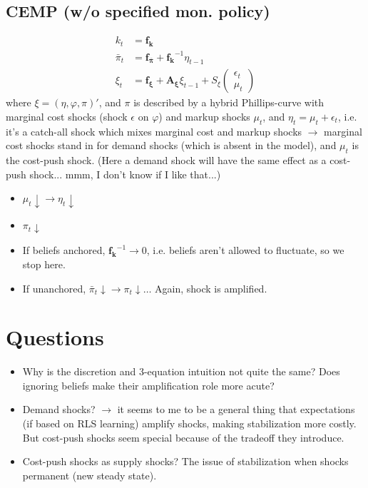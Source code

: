 \documentclass[11pt]{article}
\renewcommand{\[}{\begin{equation}}
\renewcommand{\]}{\end{equation}}
\begin{document}
	
\subsection{CEMP (w/o specified mon. policy)}
\begin{align}
k_t & = \mathbf{f_k} \\
\bar{\pi}_t &=\mathbf{f_{\bar{\pi}}} + \mathbf{f_k}^{-1}\eta_{t-1}\\
\xi_t & = \mathbf{f_{\xi}} + \mathbf{A_{\xi}} \xi_{t-1} + S_{\xi} \begin{pmatrix} \epsilon_t \\ \mu_t \end{pmatrix} 
\end{align}
where $\xi = (\eta, \varphi, \pi)'$, and $\pi$ is described by a hybrid Phillips-curve with marginal cost shocks (shock $\epsilon$ on $\varphi$) and markup shocks $\mu_t$, and $\eta_t = \mu_t + \epsilon_t$, i.e. it's a catch-all shock which mixes marginal cost and markup shocks $\rightarrow$ marginal cost shocks stand in for demand shocks (which is absent in the model), and $\mu_t$ is the cost-push shock. (Here a demand shock will have the same effect as a cost-push shock... mmm, I don't know if I like that...)
\begin{itemize}
\item $\mu_t \downarrow \rightarrow \eta_t \downarrow$
\item $\pi_t \downarrow$
\item If beliefs anchored, $\mathbf{f_k}^{-1} \rightarrow 0$, i.e. beliefs aren't allowed to fluctuate, so we stop here.
\item If unanchored, $\bar{\pi}_t \downarrow \rightarrow \pi_t \downarrow \dots$ Again, shock is amplified. 
\end{itemize}

\section{Questions}
\begin{itemize}
\item Why is the discretion and 3-equation intuition not quite the same? Does ignoring beliefs make their amplification role more acute?
\item Demand shocks? $\rightarrow$ it seems to me to be a general thing that expectations (if based on RLS learning) amplify shocks, making stabilization more costly. But cost-push shocks seem special because of the tradeoff they introduce. 
\item Cost-push shocks as supply shocks? The issue of stabilization when shocks permanent (new steady state).
\end{itemize}
\end{document}
